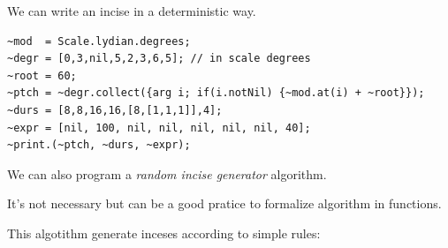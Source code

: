 We can write an incise in a deterministic way.

\begin{lstlisting}[frame=single] 
~mod  = Scale.lydian.degrees;  
~degr = [0,3,nil,5,2,3,6,5]; // in scale degrees
~root = 60;
~ptch = ~degr.collect({arg i; if(i.notNil) {~mod.at(i) + ~root}});
~durs = [8,8,16,16,[8,[1,1,1]],4];
~expr = [nil, 100, nil, nil, nil, nil, nil, 40];
~print.(~ptch, ~durs, ~expr); 
\end{lstlisting}

We can also program a \textit{random incise generator} algorithm. 

It's not necessary but can be a good pratice to formalize algorithm in functions.

This algotithm generate inceses according to simple rules:

